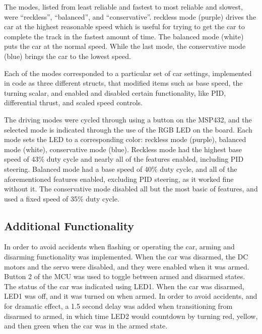 \documentclass{article}
\begin{document}
The modes, listed from least reliable and fastest to most reliable and slowest, were “reckless”, “balanced”, and “conservative”. reckless mode (purple) drives the car at the highest reasonable speed which is useful for trying to get the car to complete the track in the fastest amount of time. The balanced mode (white) puts the car at the normal speed. While the last mode, the conservative mode (blue) brings the car to the lowest speed. 

Each of the modes corresponded to a particular set of car settings, implemented in code as three different structs, that modified items such as base speed, the turning scalar, and enabled and disabled certain functionality, like PID, differential thrust, and scaled speed controls. 
	
The driving modes were cycled through using a button on the MSP432, and the selected mode is indicated through the use of the RGB LED on the board. Each mode sets the LED to a corresponding color: reckless mode (purple), balanced mode (white), conservative mode (blue). Reckless mode had the highest base speed of 43\% duty cycle and nearly all of the features enabled, including PID steering. Balanced mode had a base speed of 40\% duty cycle, and all of the aforementioned features enabled, excluding PID steering, as it worked fine without it. The conservative mode disabled all but the most basic of features, and used a fixed speed of 35\% duty cycle. 


\subsection{Additional Functionality}
In order to avoid accidents when flashing or operating the car, arming and disarming functionality was implemented. When the car was disarmed, the DC motors and the servo were disabled, and they were enabled when it was armed. Button 2 of the MCU was used to toggle between armed and disarmed states. The status of the car was indicated using LED1. When the car was disarmed, LED1 was off, and it was turned on when armed. In order to avoid accidents, and for dramatic effect, a 1.5 second delay was added when transitioning from disarmed to armed, in which time LED2 would countdown by turning red, yellow, and then green when the car was in the armed state. 
\end{document}
